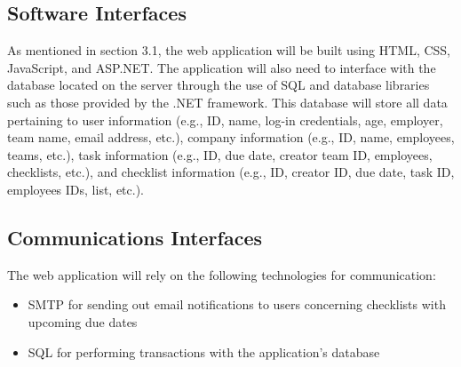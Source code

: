 \documentclass{article}
\begin{document}
\subsection{Software Interfaces}

As mentioned in section 3.1, the web application will be built using HTML, CSS, JavaScript, and ASP.NET. 
The application will also need to interface with the database located on the server through the use of SQL and database libraries such as those provided by the .NET framework. 
This database will store all data pertaining to user information (e.g., ID, name, log-in credentials, age, employer, team name, email address, etc.), company information (e.g., ID, name, employees, teams, etc.), task information (e.g., ID, due date, creator team ID, employees, checklists, etc.), and checklist information (e.g., ID, creator ID, due date, task ID, employees IDs, list, etc.).
        
\subsection{Communications Interfaces}
The web application will rely on the following technologies for communication:
\begin{itemize}
    \item SMTP for sending out email notifications to users concerning checklists with upcoming due dates
    \item SQL for performing transactions with the application's database
\end{itemize}
\end{document}
